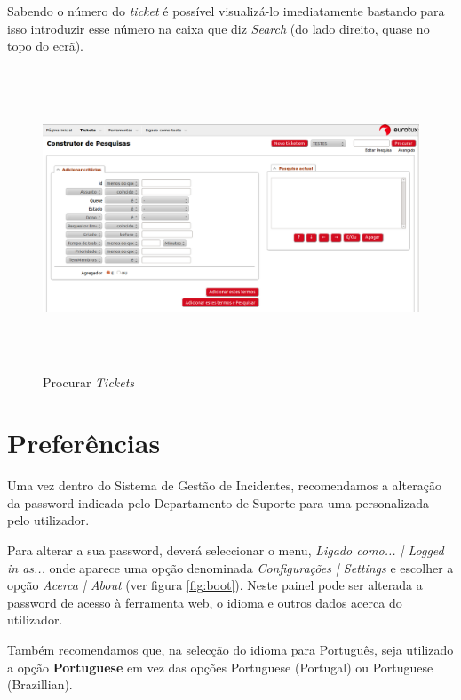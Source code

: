 Sabendo o número do \emph{ticket} é possível visualizá-lo imediatamente bastando para isso introduzir esse número na caixa que diz \emph{Search} (do lado direito, quase no topo do ecrã).

\begin{figure}[H]
\begin{center}
\includegraphics[width=16cm,height=9cm]{include/img/rt4-1-PT}
\end{center}
\caption{Procurar \emph{Tickets}}
\label{fig:rt4}
\end{figure}

\section{Preferências}
Uma vez dentro do Sistema de Gestão de Incidentes, recomendamos a alteração da password indicada pelo Departamento de Suporte para uma personalizada pelo utilizador.

Para alterar a sua password, deverá seleccionar o menu, \emph{Ligado como... | Logged in as...} onde aparece uma opção denominada \emph{Configurações | Settings} e escolher a opção \emph{Acerca | About} (ver figura \ref{fig:boot}). Neste painel pode ser alterada a password de acesso à ferramenta web, o idioma e outros dados acerca do utilizador.

Também recomendamos que, na selecção do idioma para Português, seja utilizado a opção \textbf{Portuguese} em vez das opções Portuguese (Portugal) ou Portuguese (Brazillian).

